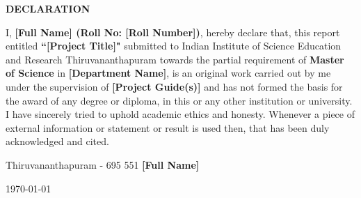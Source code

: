 \begin{center}
  {\Large{\bf{DECLARATION}}}
\end{center}

\vspace{2em}

I, \textbf{[Full Name] (Roll No: [Roll Number])}, hereby declare that, this report entitled \textbf{``[Project Title]"} submitted to Indian Institute of Science Education and Research Thiruvananthapuram towards the partial requirement of \textbf{Master of Science} in \textbf{[Department Name]}, is an original work carried out by me under the supervision of \textbf{[Project Guide(s)]} and has not formed the basis for the award of any degree or diploma, in this or any other institution or university. I have sincerely tried to uphold academic ethics and honesty. Whenever a piece of external information or statement or result is used then, that has been duly acknowledged and cited.

\vspace{3em} %

\noindent Thiruvananthapuram - 695 551 \hfill \textbf{[Full Name]}

\noindent \today \hfill

\clearpage
